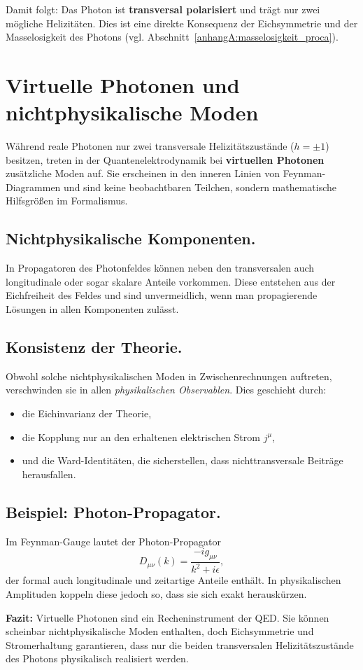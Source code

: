 \medskip
Damit folgt: Das Photon ist \textbf{transversal polarisiert}
und trägt nur zwei mögliche Helizitäten.  
Dies ist eine direkte Konsequenz der Eichsymmetrie und der
Masselosigkeit des Photons 
(vgl. Abschnitt~\ref{anhangA:masselosigkeit_proca}).
\section{Virtuelle Photonen und nichtphysikalische  Moden}
\label{anhangA:virtuelle_moden}

Während reale Photonen nur zwei transversale Helizitätszustände 
(\( h = \pm 1 \)) besitzen, treten in der Quantenelektrodynamik 
bei \textbf{virtuellen Photonen} zusätzliche Moden auf. 
Sie erscheinen in den inneren Linien von Feynman-Diagrammen und 
sind keine beobachtbaren Teilchen, sondern mathematische Hilfsgrößen 
im Formalismus.

\subsection*{Nichtphysikalische Komponenten.}
In Propagatoren des Photonfeldes können neben den transversalen
auch longitudinale oder sogar skalare Anteile vorkommen.  
Diese entstehen aus der Eichfreiheit des Feldes 
und sind unvermeidlich, wenn man propagierende Lösungen in allen 
Komponenten zulässt.

\subsection*{Konsistenz der Theorie.}
Obwohl solche nichtphysikalischen Moden in Zwischenrechnungen 
auftreten, verschwinden sie in allen \emph{physikalischen Observablen}.  
Dies geschieht durch:
\begin{itemize}
	\item die Eichinvarianz der Theorie,
	\item die Kopplung nur an den erhaltenen elektrischen Strom \( j^\mu \),
	\item und die Ward-Identitäten, die sicherstellen, 
	dass nichttransversale Beiträge herausfallen.
\end{itemize}

\subsection*{Beispiel: Photon-Propagator.}
Im Feynman-Gauge lautet der Photon-Propagator
\[
D_{\mu\nu}(k) = \frac{-i g_{\mu\nu}}{k^2 + i\epsilon} ,
\]
der formal auch longitudinale und zeitartige Anteile enthält.  
In physikalischen Amplituden koppeln diese jedoch so,
dass sie sich exakt herauskürzen.

\medskip
\textbf{Fazit:}  
Virtuelle Photonen sind ein Recheninstrument der QED.  
Sie können scheinbar nichtphysikalische Moden enthalten, 
doch Eichsymmetrie und Stromerhaltung garantieren, 
dass nur die beiden transversalen Helizitätszustände des Photons 
physikalisch realisiert werden.
